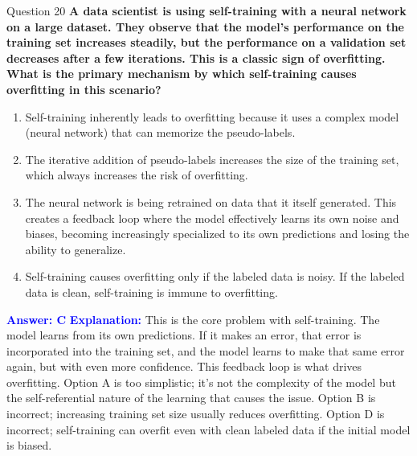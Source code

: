 \documentclass{beamer}
\begin{document}
	\begin{frame}{Question 20}
		\textbf{A data scientist is using self-training with a neural network on a large dataset. They observe that the model's performance on the training set increases steadily, but the performance on a validation set decreases after a few iterations. This is a classic sign of overfitting. What is the primary mechanism by which self-training causes overfitting in this scenario?}
		\begin{enumerate}
			\item Self-training inherently leads to overfitting because it uses a complex model (neural network) that can memorize the pseudo-labels.
			\item The iterative addition of pseudo-labels increases the size of the training set, which always increases the risk of overfitting.
			\item The neural network is being retrained on data that it itself generated. This creates a feedback loop where the model effectively learns its own noise and biases, becoming increasingly specialized to its own predictions and losing the ability to generalize.
			\item Self-training causes overfitting only if the labeled data is noisy. If the labeled data is clean, self-training is immune to overfitting.
		\end{enumerate}
		\vspace{0.2cm}
		\textcolor{blue}{\textbf{Answer: C}}
		\vspace{0.2cm}
		\textcolor{blue}{\textbf{Explanation:}} This is the core problem with self-training. The model learns from its own predictions. If it makes an error, that error is incorporated into the training set, and the model learns to make that same error again, but with even more confidence. This feedback loop is what drives overfitting. Option A is too simplistic; it's not the complexity of the model but the self-referential nature of the learning that causes the issue. Option B is incorrect; increasing training set size usually reduces overfitting. Option D is incorrect; self-training can overfit even with clean labeled data if the initial model is biased.
	\end{frame}
	
\end{document}
